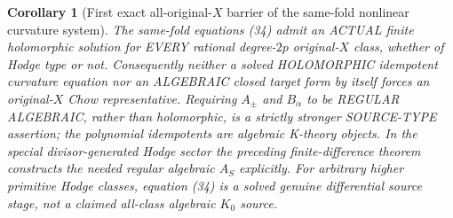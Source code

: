 \documentclass[11pt]{article}
\newtheorem{corollary}[theorem]{Corollary}
\begin{document}
\begin{corollary}[First exact all-original-$X$ barrier of the same-fold nonlinear curvature system]
The same-fold equations (34) admit an ACTUAL finite
holomorphic solution for EVERY rational degree-$2p$
original-$X$ class, whether of Hodge type or not.
Consequently neither a solved HOLOMORPHIC
idempotent curvature equation nor an ALGEBRAIC
closed target form by itself forces an
original-$X$ Chow representative.
Requiring $A_\pm$ and $B_\alpha$ to be REGULAR
ALGEBRAIC, rather than holomorphic, is a
strictly stronger SOURCE-TYPE assertion;
the polynomial idempotents are algebraic K-theory objects.
In the special divisor-generated Hodge sector
the preceding finite-difference theorem constructs
the needed regular algebraic $A_S$ explicitly.
For arbitrary higher primitive Hodge classes,
equation (34) is a solved genuine differential
source stage, not a claimed all-class algebraic
$K_0$ source.
\end{corollary}
\end{document}
